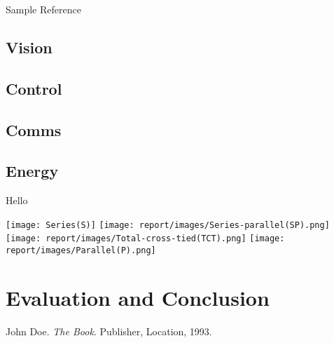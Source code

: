 \documentclass[a4paper, table]{article}
\begin{document}
Sample Reference\cite{sample}

\subsection{Vision}
\subsection{Control}
\subsection{Comms}


\subsection{Energy}
Hello

\texttt{[image: Series(S)]}
\texttt{[image: report/images/Series-parallel(SP).png]}
\texttt{[image: report/images/Total-cross-tied(TCT).png]}
\texttt{[image: report/images/Parallel(P).png]}


\section{Evaluation and Conclusion}

\newpage

\nocite{*}
\begin{thebibliography}{9}
    John Doe. 
    \textit{The Book}. 
    Publisher, Location, 1993.
\end{thebibliography}
\listoffigures
\end{document}

